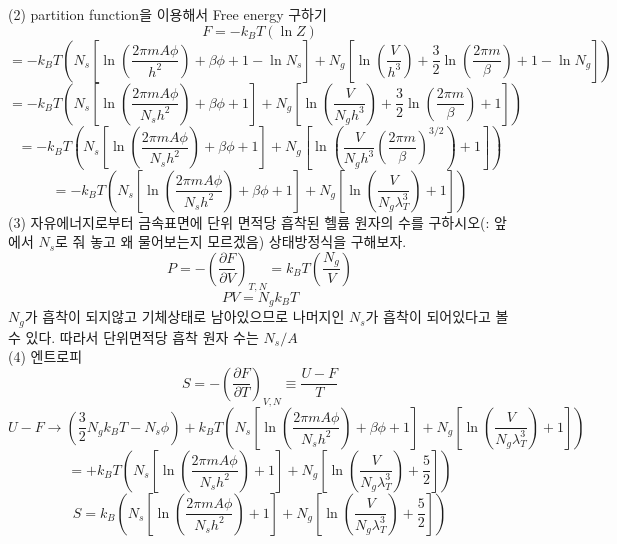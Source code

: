 \documentclass[a4paper,12pt]{article}
\begin{document}
\begin{flushleft}
	(2) partition function을 이용해서 Free energy 구하기
	$$ F=-k_B T(\ln Z)$$
	$$=-k_BT\left(N_s\left[\ln\left(\frac{2\pi m A \phi}{h^2} \right)+\beta \phi+1-\ln N_s  \right]+N_g\left[\ln\left( \frac{V}{h^3}\right)+\frac{3}{2}\ln\left(\frac{2\pi m}{\beta} \right) +1-\ln N_g  \right] \right) $$
		$$=-k_BT\left(N_s\left[\ln\left(\frac{2\pi m A \phi}{N_s h^2} \right)+\beta \phi+1  \right]+N_g\left[\ln\left( \frac{V}{N_g h^3}\right)+\frac{3}{2}\ln\left(\frac{2\pi m}{\beta} \right) +1 \right] \right) $$
		$$=-k_BT\left(N_s\left[\ln\left(\frac{2\pi m A \phi}{N_s h^2} \right)+\beta \phi+1  \right]+N_g\left[\ln\left( \frac{V}{N_g h^3}\left(\frac{2\pi m}{\beta} \right)^{3/2}\right)+1 \right] \right) $$
			$$=-k_BT\left(N_s\left[\ln\left(\frac{2\pi m A \phi}{N_s h^2} \right)+\beta \phi+1  \right]+N_g\left[\ln\left( \frac{V}{N_g \lambda_T^3}\right)+1 \right] \right) $$
	(3) 자유에너지로부터 금속표면에 단위 면적당 흡착된 헬륨 원자의 수를 구하시오(: 앞에서 $N_s$로 줘 놓고 왜 물어보는지 모르겠음)
	상태방정식을 구해보자.
	$$P=-\left( \frac{\partial F}{\partial V}\right)_{T,N}=k_BT\left( \frac{N_g}{V}\right)  $$
	$$PV=N_gk_BT$$
	$N_g$가 흡착이 되지않고 기체상태로 남아있으므로 나머지인 $N_s$가 흡착이 되어있다고 볼 수 있다. 따라서 단위면적당 흡착 원자 수는 $N_s/A$\\
	(4) 엔트로피
	$$S=-\left(\frac{\partial F}{\partial T} \right)_{V,N}\equiv \frac{U-F}{T} $$
	$$U-F\rightarrow\left(\frac{3}{2}N_gk_BT-N_s\phi \right) +k_BT\left(N_s\left[\ln\left(\frac{2\pi m A \phi}{N_s h^2} \right)+\beta \phi+1  \right]+N_g\left[\ln\left( \frac{V}{N_g \lambda_T^3}\right)+1 \right]  \right) $$
	$$= +k_BT\left(N_s\left[\ln\left(\frac{2\pi m A \phi}{N_s h^2} \right)+1  \right]+N_g\left[\ln\left( \frac{V}{N_g \lambda_T^3}\right)+\frac{5}{2} \right]  \right)$$
	$$S=k_B\left(N_s\left[\ln\left(\frac{2\pi m A \phi}{N_s h^2} \right)+1  \right]+N_g\left[\ln\left( \frac{V}{N_g \lambda_T^3}\right)+\frac{5}{2} \right]  \right)$$
	
\end{flushleft}
\end{document}
